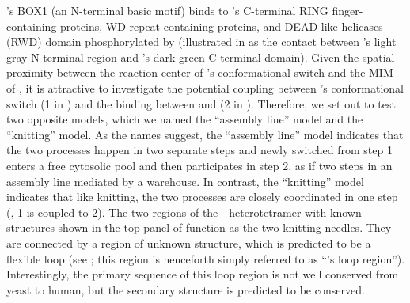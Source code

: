 's BOX1 (an N-terminal basic motif) binds to 's C-terminal RING finger-containing proteins, WD repeat-containing proteins, and DEAD-like helicases (RWD) domain phosphorylated by  \cite{Ji2017eLife, BUB1-CDC20-MAD1} (illustrated in  as the contact between 's light gray N-terminal region and 's dark green C-terminal domain). Given the spatial proximity between the reaction center of 's conformational switch and the MIM of , it is attractive to investigate the potential coupling between 's conformational switch (\textcircled{\small{1}} in ) and the binding between  and  (\textcircled{\small{2}} in ). Therefore, we set out to test two opposite models, which we named the ``assembly line'' model and the ``knitting'' model. As the names suggest, the ``assembly line'' model indicates that the two processes happen in two separate steps and newly switched  from step \textcircled{\small{1}} enters a free cytosolic pool and then participates in step \textcircled{\small{2}}, as if two steps in an assembly line mediated by a warehouse. In contrast, the ``knitting'' model indicates that like knitting, the two processes are closely coordinated in one step  (, \textcircled{\small{1}} is coupled to \textcircled{\small{2}}). The two regions of the - heterotetramer with known structures shown in the top panel of  function as the two knitting needles. They are connected by a region of unknown structure, which is predicted to be a flexible loop (see ; this region is henceforth simply referred to as ``'s loop region''). Interestingly, the primary sequence of this loop region is not well conserved from yeast to human, but the secondary structure is predicted to be conserved.


